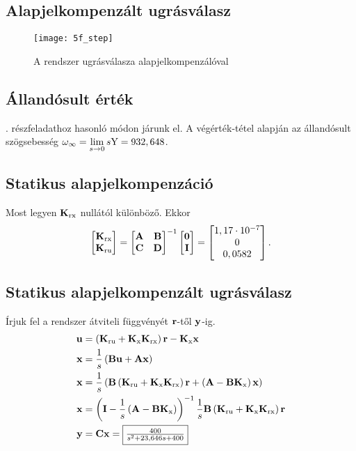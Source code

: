 
\subsection{Alapjelkompenzált ugrásválasz}

\begin{figure}[H]
	\centering
	\texttt{[image: 5f\_step]}
	\caption{A rendszer ugrásválasza alapjelkompenzálóval}
	\label{fig:5f_step}
\end{figure}


\subsection{Állandósult érték}

. részfeladathoz hasonló módon járunk el.
A végérték-tétel alapján az állandósult szögsebesség $\omega_\infty = \lim\limits_{s\rightarrow 0}s\fn{Y} = 932,648$.%


\subsection{Statikus alapjelkompenzáció}

Most legyen $\B{K}_\text{rx}$ nullától különböző.
Ekkor
\begin{equation}
	\mat{\B{K}_\text{rx}\\\B{K}_\text{ru}}=\mat{\B{A}&\B{B}\\\B{C}&\B{D}}^{-1}\mat{\B{0}\\\B{I}}
	= \mat{1,17\cdot10^{-7}\\0\\0,0582}.
\end{equation}


\subsection{Statikus alapjelkompenzált ugrásválasz}

Írjuk fel a rendszer átviteli függvényét $\B{r}$-től $\B{y}$-ig.
\begin{align}
	\B{u} &= \brc{\B{K}_\text{ru}+\B{K}_\text{x}\B{K}_\text{rx}}\B{r} - \B{K}_\text{x}\B{x}\\
	\B{x} &= \frac{1}{s}\brc{\B{B}\B{u} + \B{A}\B{x}}\\
	\B{x} &= \frac{1}{s}\brc{\B{B}\brc{\B{K}_\text{ru}+\B{K}_\text{x}\B{K}_\text{rx}}\B{r}+\brc{\B{A}-\B{B}\B{K}_\text{x}}\B{x}}\\
	\B{x} &= \brc{\B{I}-\frac{1}{s}\brc{\B{A}-\B{B}\B{K}_\text{x} }}^{-1}\frac{1}{s}\B{B}\brc{\B{K}_\text{ru}+\B{K}_\text{x}\B{K}_\text{rx}}\B{r}\\
	\B{y} &= \B{C}\B{x} = \fbox{$\frac{400}{s^2 + 23,646 s + 400}$}
\end{align}

